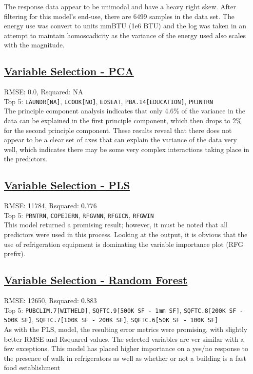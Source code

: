 The response data appear to be unimodal and have a heavy right skew.  After filtering for this model's end-use, there are 6499 samples in the data set.  The energy use was convert to units mmBTU (1e6 BTU) and the log was taken in an attempt to maintain homoscadicity as the variance of the energy used also scales with the magnitude.

\subsection{\hyperref[appendix:electricity:pca]{Variable Selection - PCA}}
RMSE: 0.0, Rsquared: NA\\
Top 5: \lstinline{LAUNDR[NA]}, \lstinline{LCOOK[NO]}, \lstinline{EDSEAT}, \lstinline{PBA.14[EDUCATION]}, \lstinline{PRINTRN}
\\[0.1in]
\indent The principle component analysis indicates that only 4.6\% of the variance in the data can be explained in the first principle component, which then drops to 2\% for the second principle component.  These results reveal that there does not appear to be a clear set of axes that can explain the variance of the data very well, which indicates there may be some very complex interactions taking place in the predictors.

\subsection{\hyperref[appendix:electricity:pls]{Variable Selection - PLS}}
RMSE: 11784, Rsquared: 0.776\\
Top 5: \lstinline{PRNTRN}, \lstinline{COPEIERN}, \lstinline{RFGVNN}, \lstinline{RFGICN}, \lstinline{RFGWIN}
\\[0.1in]
\indent This model returned a promising result; however, it must be noted that all predictors were used in this process.  Looking at the output, it is obvious that the use of refrigeration equipment is dominating the variable importance plot (RFG prefix).  

\subsection{\hyperref[appendix:electricity:rf]{Variable Selection - Random Forest}}
RMSE: 12650, Rsquared: 0.883\\
Top 5: \lstinline{PUBCLIM.7[WITHELD]}, \lstinline{SQFTC.9[500K SF - 1mm SF]}, \lstinline{SQFTC.8[200K SF - 500K SF]}, \lstinline{SQFTC.7[100K SF - 200K SF]}, \lstinline{SQFTC.6[50K SF - 100K SF]}
\\[0.1in]
\indent As with the PLS, model, the resulting error metrics were promising, with slightly better RMSE and Rsquared values.  The selected variables are ver similar with a few exceptions.  This model has placed higher importance on a yes/no response to the presence of walk in refrigerators as well as whether or not a building is a fast food establishment

